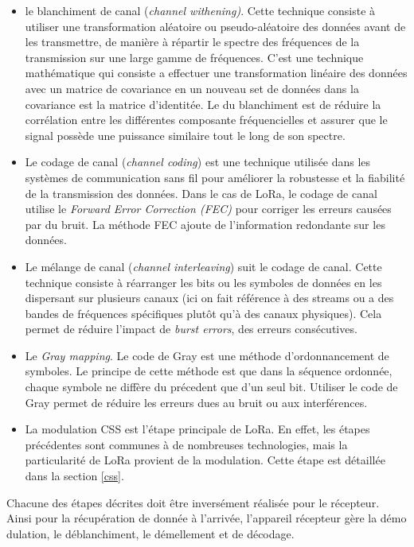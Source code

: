 \begin{itemize}
\item le blanchiment de canal (\textit{channel withening)}.
Cette technique consiste à utiliser une transformation aléatoire ou pseudo-aléatoire des données avant de les transmettre, de manière à répartir le spectre des fréquences de la transmission sur une large gamme de fréquences. C'est une technique mathématique qui consiste a effectuer une transformation linéaire des données avec un matrice de covariance en un nouveau set de données dans la covariance est la matrice d'identitée. Le du blanchiment est de réduire la corrélation entre les différentes composante fréquencielles et assurer que le signal possède une puissance similaire tout le long de son spectre.
\item Le codage de canal (\textit{channel coding}) est une technique utilisée dans les systèmes de communication sans fil pour améliorer la robustesse et la fiabilité de la transmission des données. Dans le cas de LoRa, le codage de canal utilise le \textit{Forward Error Correction (FEC)} pour corriger les erreurs causées par du bruit. La méthode FEC ajoute de l'information redondante sur les données.
\item Le mélange de canal (\textit{channel interleaving}) suit le codage de canal.  
Cette technique consiste à réarranger les bits ou les symboles de données en les dispersant sur plusieurs canaux (ici on fait référence à des streams ou a des bandes de fréquences spécifiques plutôt qu'à des canaux physiques). Cela permet de réduire l'impact de \textit{burst errors}, des erreurs consécutives.
\item Le \textit{Gray mapping}. Le code de Gray est une méthode d'ordonnancement de symboles. Le principe de cette méthode est que dans la séquence ordonnée, chaque symbole ne diffère du précedent que d'un seul bit. Utiliser le code de Gray permet de réduire les erreurs dues au bruit ou aux interférences.
\item La modulation CSS est l'étape principale de LoRa. En effet, les étapes précédentes sont communes à de nombreuses technologies, mais la particularité de LoRa provient de la modulation. Cette étape est détaillée dans la section \ref{css}.
\end{itemize}

\vspace{0.1cm}

Chacune des étapes décrites doit être inversément réalisée pour le récepteur. Ainsi pour la récupération de donnée à l'arrivée, l'appareil récepteur gère la démo \\ dulation, le déblanchiment, le démellement et de décodage.

